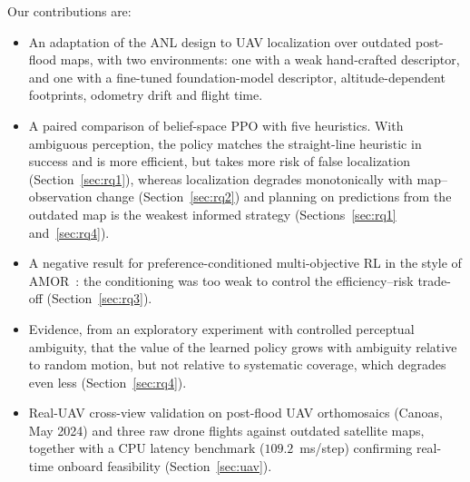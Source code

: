 Our contributions are:
\begin{itemize}
\item An adaptation of the ANL design to UAV localization over outdated post-flood maps, with two environments: one with a weak hand-crafted descriptor, and one with a fine-tuned foundation-model descriptor, altitude-dependent footprints, odometry drift and flight time.
\item A paired comparison of belief-space PPO with five heuristics. With ambiguous perception, the policy matches the straight-line heuristic in success and is more efficient, but takes more risk of false localization (Section~\ref{sec:rq1}), whereas localization degrades monotonically with map--observation change (Section~\ref{sec:rq2}) and planning on predictions from the outdated map is the weakest informed strategy (Sections~\ref{sec:rq1} and~\ref{sec:rq4}).
\item A negative result for preference-conditioned multi-objective RL in the style of AMOR~\cite{alegre2025amor}: the conditioning was too weak to control the efficiency--risk trade-off (Section~\ref{sec:rq3}).
\item Evidence, from an exploratory experiment with controlled perceptual ambiguity, that the value of the learned policy grows with ambiguity relative to random motion, but not relative to systematic coverage, which degrades even less (Section~\ref{sec:rq4}).
\item Real-UAV cross-view validation on post-flood UAV orthomosaics (Canoas, May 2024) and three raw drone flights against outdated satellite maps, together with a CPU latency benchmark ($109.2$~ms/step) confirming real-time onboard feasibility (Section~\ref{sec:uav}).
\end{itemize}
